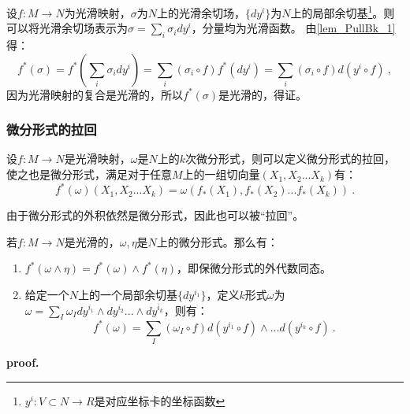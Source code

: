 设$f:M\rightarrow N$为光滑映射，$\sigma$为$N$上的光滑余切场，$\{dy^i\}$为$N$上的局部余切基\footnote{$y^i:V\subset N\rightarrow R$是对应坐标卡的坐标函数}。则可以将光滑余切场表示为$\sigma=\sum_i\sigma_idy^i $，分量均为光滑函数。
由\autoref{lem_PullBk_1} 得：
\begin{equation}
f^*(\sigma)=f^*(\sum_i\sigma_idy^i)=\sum_i(\sigma_i\circ f)f^*(dy^i)=\sum_i(\sigma_i\circ f)d(y^i\circ f)~,
\end{equation}
因为光滑映射的复合是光滑的，所以$f^*(\sigma)$是光滑的，得证。
\subsubsection{微分形式的拉回}
\begin{definition}{}
设$f:M\rightarrow N$是光滑映射，$\omega$是$N$上的$k$次微分形式，则可以定义微分形式的拉回，使之也是微分形式，满足对于任意$M$上的一组切向量$(X_1,X_2...X_k)$有：
\begin{equation}
f^*(\omega)(X_1,X_2...X_k)=\omega(f_*(X_1),f_*(X_2)...f_*(X_k))~.
\end{equation}
\end{definition}
由于微分形式的外积依然是微分形式，因此也可以被“拉回”。
\begin{theorem}{}\label{the_PullBk_1}
若$f:M\rightarrow N$是光滑的，$\omega,\eta$是$N$上的微分形式。那么有：
\begin{enumerate}
\item $f^*(\omega\wedge \eta)=f^*(\omega)\wedge f^*(\eta)$，即保微分形式的外代数同态。
\item 给定一个$N$上的一个局部余切基$\{dy^{i_1}\}$，定义$k$形式$\omega$为$\omega=\sum_I\omega_I dy^{i_1}\wedge dy^{i_2}...\wedge dy^{i_k}$，则有：
\begin{equation}
f^*(\omega)=\sum_I (\omega_I\circ f)d(y^{i_1}\circ f)\wedge...d(y^{i_k}\circ f)~.
\end{equation}
\end{enumerate}
\end{theorem}
\textbf{proof.}

